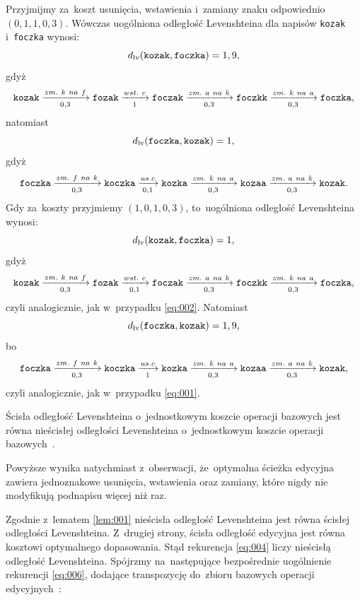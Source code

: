 \documentclass{praca1}
\begin{document}
\begin{example}
Przyjmijmy za~koszt usunięcia, wstawienia i~zamiany znaku odpowiednio $(0,1, 1, 0,3)$. Wówczas uogólniona odległość Levenshteina dla napisów \verb|kozak| i~\verb|foczka| wynosi:
\begin{equation}
\label{eq:001}
d_{\mathrm{lv}}(\verb|kozak|, \verb|foczka|) = 1,9,
\end{equation}
gdyż
$$
\verb|kozak|  \xrightarrow[0,3]{zm.\ k\ na\ f} \verb|fozak| \xrightarrow[1]{wst.\ c} \verb|foczak| \xrightarrow[0,3]{zm.\ a\ na\ k} \verb|foczkk| \xrightarrow[0,3]{zm.\ k\ na\ a} \verb|foczka|,
$$
natomiast
\begin{equation}\label{eq:002}
d_{\mathrm{lv}}(\verb|foczka|, \verb|kozak|) = 1,
\end{equation}
gdyż
$$
\verb|foczka|  \xrightarrow[0,3]{zm.\ f\ na\ k} \verb|koczka|  \xrightarrow[0,1]{us. c} \verb|kozka| \xrightarrow[0,3]{zm.\ k\ na\ a} \verb|kozaa| \xrightarrow[0,3]{zm.\ a\ na\ k} \verb|kozak|.
$$
Gdy za~koszty przyjmiemy $(1, 0,1, 0,3)$, to~uogólniona odległość Levenshteina wynosi:
$$
d_{\mathrm{lv}}(\verb|kozak|, \verb|foczka|) = 1,
$$
gdyż
$$
\verb|kozak|  \xrightarrow[0,3]{zm.\ k\ na\ f} \verb|fozak| \xrightarrow[0,1]{wst.\ c} \verb|foczak| \xrightarrow[0,3]{zm.\ a\ na\ k} \verb|foczkk| \xrightarrow[0,3]{zm.\ k\ na\ a} \verb|foczka|,
$$
czyli analogicznie, jak w~przypadku \eqref{eq:002}. Natomiast
$$
d_{\mathrm{lv}}(\verb|foczka|, \verb|kozak|) = 1,9,
$$
bo
$$
\verb|foczka|  \xrightarrow[0,3]{zm.\ f\ na\ k} \verb|koczka|  \xrightarrow[1]{us. c} \verb|kozka| \xrightarrow[0,3]{zm.\ k\ na\ a} \verb|kozaa| \xrightarrow[0,3]{zm.\ a\ na\ k} \verb|kozak|,
$$
czyli analogicznie, jak w~przypadku \eqref{eq:001}.
\end{example}


\begin{lemma}
\label{lem:001}
Ścisła odległość Levenshteina o~jednostkowym koszcie operacji bazowych jest równa nieścisłej odległości Levenshteina o~jednostkowym koszcie operacji bazowych~\cite{Boytsov2011:indexingmethods}.
\end{lemma}

Powyższe wynika natychmiast z~obserwacji, że~optymalna ścieżka edycyjna zawiera jednoznakowe usunięcia, wstawienia oraz zamiany, które nigdy nie modyfikują podnapisu więcej niż raz.


Zgodnie z~lematem \ref{lem:001} nieścisła odległość Levenshteina jest równa ścisłej odległości Levenshteina. Z~drugiej strony, ścisła odległość edycyjna jest równa kosztowi optymalnego dopasowania. Stąd rekurencja \eqref{eq:004} liczy nieścisłą odległość Levenshteina. Spójrzmy na~następujące bezpośrednie uogólnienie rekurencji \eqref{eq:006}, dodające transpozycję do~zbioru bazowych operacji edycyjnych~\cite{Boytsov2011:indexingmethods}:
\end{document}
